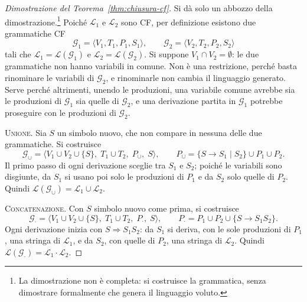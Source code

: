 \documentclass[a4paper, 11pt, oneside]{book}
\theoremstyle{formale}
\begin{document}
    \begin{proof}[Dimostrazione del Teorema~\ref{thm:chiusura-cf}]
        Si d\`a solo un abbozzo della dimostrazione.\footnote{La dimostrazione non \`e
        completa: si costruisce la grammatica, senza dimostrare formalmente che genera il
        linguaggio voluto.} Poich\'e $\mathcal{L}_1$ e $\mathcal{L}_2$ sono CF, per
        definizione esistono due grammatiche CF
        \begin{equation*}
            \mathcal{G}_1 = \langle V_1, T_1, P_1, S_1 \rangle, \qquad
            \mathcal{G}_2 = \langle V_2, T_2, P_2, S_2 \rangle
        \end{equation*}
        tali che $\mathcal{L}_1 = \mathcal{L}(\mathcal{G}_1)$ e
        $\mathcal{L}_2 = \mathcal{L}(\mathcal{G}_2)$. Si suppone
        $V_1 \cap V_2 = \emptyset$: le due grammatiche non hanno variabili in
        comune. Non \`e una restrizione,
        perch\'e basta rinominare le variabili di $\mathcal{G}_2$, e rinominarle non cambia
        il linguaggio generato. Serve perch\'e altrimenti, unendo le produzioni, una
        variabile comune avrebbe sia le produzioni di $\mathcal{G}_1$ sia quelle di
        $\mathcal{G}_2$, e una derivazione partita in $\mathcal{G}_1$ potrebbe proseguire
        con le produzioni di $\mathcal{G}_2$.

        \textsc{Unione}. Sia $S$ un simbolo nuovo, che non compare in nessuna delle due
        grammatiche. Si costruisce
        \begin{equation*}
            \mathcal{G}_\cup = \langle V_1 \cup V_2 \cup \{S\},\; T_1 \cup T_2,\; P_\cup,\;
            S \rangle,
            \qquad
            P_\cup = \{S \to S_1 \mid S_2\} \cup P_1 \cup P_2.
        \end{equation*}
        Il primo passo di ogni derivazione sceglie tra $S_1$ e $S_2$; poich\'e le
        variabili sono disgiunte, da $S_1$ si usano poi solo le produzioni di $P_1$ e da
        $S_2$ solo quelle di $P_2$. Quindi
        $\mathcal{L}(\mathcal{G}_\cup) = \mathcal{L}_1 \cup \mathcal{L}_2$.

        \textsc{Concatenazione}. Con $S$ simbolo nuovo come prima, si costruisce
        \begin{equation*}
            \mathcal{G}_\cdot = \langle V_1 \cup V_2 \cup \{S\},\; T_1 \cup T_2,\;
            P_\cdot,\; S \rangle,
            \qquad
            P_\cdot = P_1 \cup P_2 \cup \{S \to S_1 S_2\}.
        \end{equation*}
        Ogni derivazione inizia con $S \Rightarrow S_1 S_2$: da $S_1$ si deriva, con le
        sole produzioni di $P_1$, una stringa di $\mathcal{L}_1$, e da $S_2$, con quelle di
        $P_2$, una stringa di $\mathcal{L}_2$. Quindi
        $\mathcal{L}(\mathcal{G}_\cdot) = \mathcal{L}_1 \cdot \mathcal{L}_2$.


\end{proof}
\end{document}
